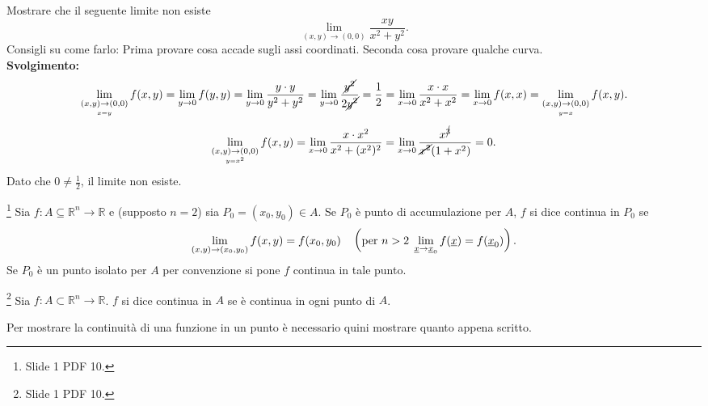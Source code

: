\begin{exercise}\label{exercise:limite_non_esiste_casa}
    Mostrare che il seguente limite non esiste
    \begin{equation*}
        \lim_{(x,y)\rightarrow(0,0)}\frac{xy}{x^2+y^2}.
    \end{equation*}
    Consigli su come farlo: Prima provare cosa accade sugli assi coordinati. Seconda cosa provare qualche curva.\\
    \textbf{Svolgimento:}
    \begin{equation*}
        \lim_{\underset{x=y}{(x,y)\rightarrow(0,0)}}f(x,y)=\lim_{y\rightarrow 0}f(y,y)=\lim_{y\rightarrow 0}\frac{y\cdot y}{y^2+y^2}=\lim_{y\rightarrow 0}\frac{\cancel{y^2}}{2\cancel{y^2}}=\frac{1}{2}=\lim_{x\rightarrow 0}\frac{x\cdot x}{x^2+x^2}=\lim_{x\rightarrow 0}f(x,x)=\lim_{\underset{y=x}{(x,y)\rightarrow(0,0)}}f(x,y).
    \end{equation*}
    \begin{equation*}
       \lim_{\underset{y=x^2}{(x,y)\rightarrow(0,0)}}f(x,y)=\lim_{x\rightarrow 0}\frac{x\cdot x^2}{x^2+(x^2)^2}=\lim_{x\rightarrow 0}\frac{x^{\cancel{3}}}{\cancel{x^2}(1+x^2)}=0.
    \end{equation*}
    Dato che $0\neq \frac{1}{2}$, il limite non esiste.
\end{exercise}

\begin{definition}\footnote{Slide 1 PDF 10.}\label{def:continuita_funzione_n_variabili}
    Sia $f\colon A\subseteq\mathbb R^n\rightarrow\mathbb R$ e (supposto $n=2$) sia $P_0=(x_0,y_0)\in A$. Se $P_0$ è punto di accumulazione per $A$, $f$ si dice continua in $P_0$ se
    \begin{equation}\label{eq:limite_continuita}
        \lim_{(x,y)\rightarrow(x_0,y_0)}f(x,y)=f(x_0,y_0)\quad \left(\text{per } n>2\; \lim_{\uline x\rightarrow\uline x_0}f(\uline x)=f(\uline x_0)\right).
    \end{equation}
    Se $P_0$ è un punto isolato per $A$ per convenzione si pone $f$ continua in tale punto.
\end{definition}

\begin{definition}\footnote{Slide 1 PDF 10.}
    Sia $f\colon A\subset\mathbb R^n\rightarrow\mathbb R$. $f$ si dice continua in $A$ se è continua in ogni punto di $A$.
\end{definition}

Per mostrare la continuità di una funzione in un punto è necessario quini mostrare quanto appena scritto.

